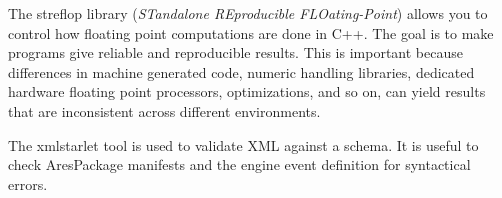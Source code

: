 The streflop library ({\it STandalone REproducible FLOating-Point}) allows you to control how floating point computations are done in C++. The goal is to make programs give reliable and reproducible results. This is important because differences in machine generated code, numeric handling libraries, dedicated hardware floating point processors, optimizations, and so on, can yield results that are inconsistent across different environments.


The xmlstarlet tool is used to validate XML against a schema. It is useful to check AresPackage manifests and the engine event definition for syntactical errors.
\stopitemize

